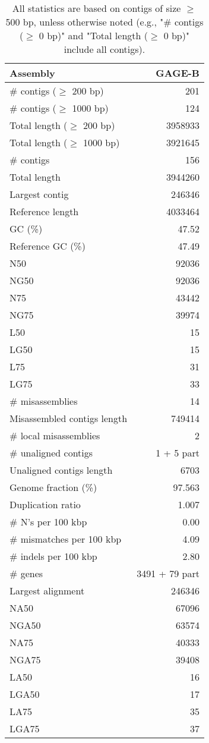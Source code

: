 \documentclass[12pt,a4paper]{article}
\begin{document}
\begin{table}[ht]
\begin{center}
\caption{All statistics are based on contigs of size $\geq$ 500 bp, unless otherwise noted (e.g., "\# contigs ($\geq$ 0 bp)" and "Total length ($\geq$ 0 bp)" include all contigs).}
\begin{tabular}{|l*{1}{|r}|}
\hline
Assembly & GAGE-B \\ \hline
\# contigs ($\geq$ 200 bp) & 201 \\ \hline
\# contigs ($\geq$ 1000 bp) & 124 \\ \hline
Total length ($\geq$ 200 bp) & 3958933 \\ \hline
Total length ($\geq$ 1000 bp) & 3921645 \\ \hline
\# contigs & 156 \\ \hline
Total length & 3944260 \\ \hline
Largest contig & 246346 \\ \hline
Reference length & 4033464 \\ \hline
GC (\%) & 47.52 \\ \hline
Reference GC (\%) & 47.49 \\ \hline
N50 & 92036 \\ \hline
NG50 & 92036 \\ \hline
N75 & 43442 \\ \hline
NG75 & 39974 \\ \hline
L50 & 15 \\ \hline
LG50 & 15 \\ \hline
L75 & 31 \\ \hline
LG75 & 33 \\ \hline
\# misassemblies & 14 \\ \hline
Misassembled contigs length & 749414 \\ \hline
\# local misassemblies & 2 \\ \hline
\# unaligned contigs & 1 + 5 part \\ \hline
Unaligned contigs length & 6703 \\ \hline
Genome fraction (\%) & 97.563 \\ \hline
Duplication ratio & 1.007 \\ \hline
\# N's per 100 kbp & 0.00 \\ \hline
\# mismatches per 100 kbp & 4.09 \\ \hline
\# indels per 100 kbp & 2.80 \\ \hline
\# genes & 3491 + 79 part \\ \hline
Largest alignment & 246346 \\ \hline
NA50 & 67096 \\ \hline
NGA50 & 63574 \\ \hline
NA75 & 40333 \\ \hline
NGA75 & 39408 \\ \hline
LA50 & 16 \\ \hline
LGA50 & 17 \\ \hline
LA75 & 35 \\ \hline
LGA75 & 37 \\ \hline
\end{tabular}
\end{center}
\end{table}
\end{document}

